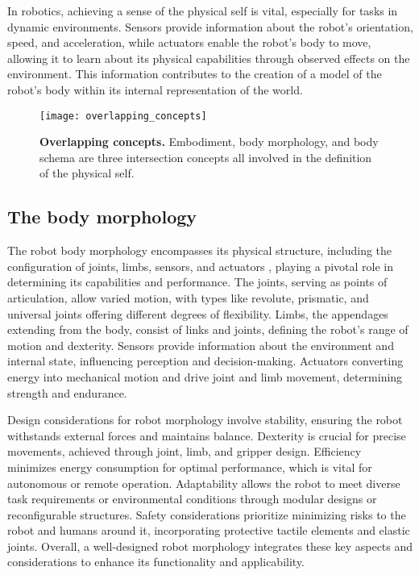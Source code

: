 In robotics, achieving a sense of the physical self is vital, especially for tasks in dynamic environments. Sensors provide information about the robot's orientation, speed, and acceleration, while actuators enable the robot's body to move, allowing it to learn about its physical capabilities through observed effects on the environment. This information contributes to the creation of a model of the robot's body within its internal representation of the world.
\begin{figure}
	\begin{center}
		\texttt{[image: overlapping\_concepts]}
		\caption{\textbf{Overlapping concepts.} Embodiment, body morphology, and body schema are three intersection concepts all involved in the definition of the physical self.}
		\label{fig:overlapping_concepts}
	\end{center}
\end{figure}



\subsection{The body morphology}
The robot body morphology encompasses its physical structure, including the configuration of joints, limbs, sensors, and actuators \cite{Pfeifer2007SelfOrganizationEmbodiment}, playing a pivotal role in determining its capabilities and performance. The joints, serving as points of articulation, allow varied motion, with types like revolute, prismatic, and universal joints offering different degrees of flexibility. Limbs, the appendages extending from the body, consist of links and joints, defining the robot's range of motion and dexterity. Sensors provide information about the environment and internal state, influencing perception and decision-making. Actuators converting energy into mechanical motion and drive joint and limb movement, determining strength and endurance.

Design considerations for robot morphology involve stability, ensuring the robot withstands external forces and maintains balance. Dexterity is crucial for precise movements, achieved through joint, limb, and gripper design. Efficiency minimizes energy consumption for optimal performance, which is vital for autonomous or remote operation. Adaptability allows the robot to meet diverse task requirements or environmental conditions through modular designs or reconfigurable structures. Safety considerations prioritize minimizing risks to the robot and humans around it, incorporating protective tactile elements and elastic joints. Overall, a well-designed robot morphology integrates these key aspects and considerations to enhance its functionality and applicability.

